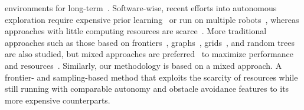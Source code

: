 \documentclass[lettersize,journal,twoside]{IEEEtran}
\theoremstyle{definition}
\begin{document}
environments for long-term~\cite{eldemiry2022autonomous,bircher2016receding}.
%
Software-wise, %
recent efforts into autonomous exploration require expensive prior learning~\cite{shrestha2019learned} or run on multiple robots~\cite{kulkarni2022autonomous,tranzatto2022cerberus,roucek2020darpa}, whereas %
approaches with little computing resources are scarce~\cite{bircher2016receding,batinovic2021multi,faisal2021low,muller2021openbot}. More traditional approaches such as those based on frontiers~\cite{kim2022autonomous,roucek2020darpa,batinovic2021multi}, graphs~\cite{kulkarni2022autonomous,tranzatto2022cerberus,dang2019graph}, grids~\cite{corah2019communication,tabib2022autonomous}, and random trees %
are also studied, but mixed approaches are %
preferred~\cite{%
shrestha2019learned,bircher2016receding,surmann2003autonomous,qiao2019sampling,
dai2020fast} to maximize performance and resources~\cite{placed2022survey,bircher2016receding}.
%
Similarly, our methodology is based on a mixed approach. A frontier- and sampling-based method that exploits the scarcity of resources while still running %
with comparable autonomy and obstacle avoidance features to its more expensive counterparts. %
\end{document}
